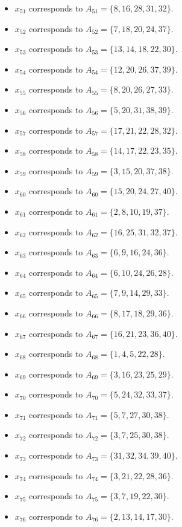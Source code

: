 \documentclass[11pt]{article}
\begin{document}
\begin{itemize}
\item $x_{51}$ corresponds to $A_{51}=\{8, 16, 28, 31, 32\}$.
\item $x_{52}$ corresponds to $A_{52}=\{7, 18, 20, 24, 37\}$.
\item $x_{53}$ corresponds to $A_{53}=\{13, 14, 18, 22, 30\}$.
\item $x_{54}$ corresponds to $A_{54}=\{12, 20, 26, 37, 39\}$.
\item $x_{55}$ corresponds to $A_{55}=\{8, 20, 26, 27, 33\}$.
\item $x_{56}$ corresponds to $A_{56}=\{5, 20, 31, 38, 39\}$.
\item $x_{57}$ corresponds to $A_{57}=\{17, 21, 22, 28, 32\}$.
\item $x_{58}$ corresponds to $A_{58}=\{14, 17, 22, 23, 35\}$.
\item $x_{59}$ corresponds to $A_{59}=\{3, 15, 20, 37, 38\}$.
\item $x_{60}$ corresponds to $A_{60}=\{15, 20, 24, 27, 40\}$.
\item $x_{61}$ corresponds to $A_{61}=\{2, 8, 10, 19, 37\}$.
\item $x_{62}$ corresponds to $A_{62}=\{16, 25, 31, 32, 37\}$.
\item $x_{63}$ corresponds to $A_{63}=\{6, 9, 16, 24, 36\}$.
\item $x_{64}$ corresponds to $A_{64}=\{6, 10, 24, 26, 28\}$.
\item $x_{65}$ corresponds to $A_{65}=\{7, 9, 14, 29, 33\}$.
\item $x_{66}$ corresponds to $A_{66}=\{8, 17, 18, 29, 36\}$.
\item $x_{67}$ corresponds to $A_{67}=\{16, 21, 23, 36, 40\}$.
\item $x_{68}$ corresponds to $A_{68}=\{1, 4, 5, 22, 28\}$.
\item $x_{69}$ corresponds to $A_{69}=\{3, 16, 23, 25, 29\}$.
\item $x_{70}$ corresponds to $A_{70}=\{5, 24, 32, 33, 37\}$.
\item $x_{71}$ corresponds to $A_{71}=\{5, 7, 27, 30, 38\}$.
\item $x_{72}$ corresponds to $A_{72}=\{3, 7, 25, 30, 38\}$.
\item $x_{73}$ corresponds to $A_{73}=\{31, 32, 34, 39, 40\}$.
\item $x_{74}$ corresponds to $A_{74}=\{3, 21, 22, 28, 36\}$.
\item $x_{75}$ corresponds to $A_{75}=\{3, 7, 19, 22, 30\}$.
\item $x_{76}$ corresponds to $A_{76}=\{2, 13, 14, 17, 30\}$.

\end{itemize}
\end{document}
